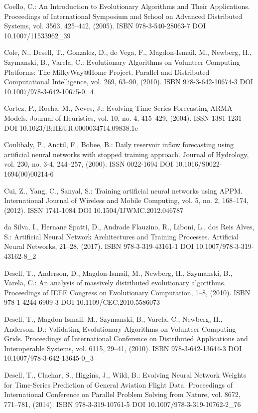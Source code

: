 \begin{thebibliography}{99.}
 Coello, C.: An Introduction to Evolutionary Algorithms and Their Applications. Proceedings of International Symposium and School on Advanced Distributed Systems, vol. 3563, 425--442, (2005). ISBN 978-3-540-28063-7 DOI 10.1007/11533962\_39

 Cole, N., Desell, T., Gonzalez, D., de Vega, F., Magdon-Ismail, M., Newberg, H., Szymanski, B., Varela, C.:  Evolutionary Algorithms on Volunteer Computing Platforms: The MilkyWay@Home Project. Parallel and Distributed Computational Intelligence, vol. 269, 63--90, (2010). ISBN 978-3-642-10674-3 DOI 10.1007/978-3-642-10675-0\_4

 Cortez, P., Rocha, M., Neves, J.: Evolving Time Series Forecasting ARMA Models. Journal of Heuristics, vol. 10, no. 4, 415--429, (2004). ISSN 1381-1231 DOI 10.1023/B:HEUR.0000034714.09838.1e

 Coulibaly, P., Anctil, F., Bobee, B.: Daily reservoir inflow forecasting using artificial neural networks with stopped training approach. Journal of Hydrology, vol. 230, no. 3-4, 244--257, (2000). ISSN 0022-1694 DOI 10.1016/S0022-1694(00)00214-6

 Cui, Z., Yang, C., Sanyal, S.: Training artificial neural networks using APPM. International Journal of Wireless and Mobile Computing, vol. 5, no. 2, 168--174, (2012). ISSN 1741-1084 DOI 10.1504/IJWMC.2012.046787

 da Silva, I., Hernane Spatti, D., Andrade Flauzino, R., Liboni, L., dos Reis Alves, S.: Artificial Neural Network Architectures and Training Processes. Artificial Neural Networks, 21--28, (2017). ISBN 978-3-319-43161-1 DOI 10.1007/978-3-319-43162-8\_2

 Desell, T., Anderson, D., Magdon-Ismail, M., Newberg, H., Szymanski, B., Varela, C.: An analysis of massively distributed evolutionary algorithms. Proceedings of IEEE Congress on Evolutionary Computation, 1--8, (2010). ISBN 978-1-4244-6909-3 DOI 10.1109/CEC.2010.5586073

 Desell, T., Magdon-Ismail, M., Szymanski, B., Varela, C., Newberg, H., Anderson, D.: Validating Evolutionary Algorithms on Volunteer Computing Grids. Proceedings of International Conference on Distributed Applications and Interoperable Systems, vol. 6115, 29--41, (2010). ISBN 978-3-642-13644-3 DOI 10.1007/978-3-642-13645-0\_3

 Desell, T., Clachar, S., Higgins, J., Wild, B.: Evolving Neural Network Weights for Time-Series Prediction of General Aviation Flight Data. Proceedings of International Conference on Parallel Problem Solving from Nature, vol. 8672, 771--781, (2014). ISBN 978-3-319-10761-5 DOI 10.1007/978-3-319-10762-2\_76


\end{thebibliography}
